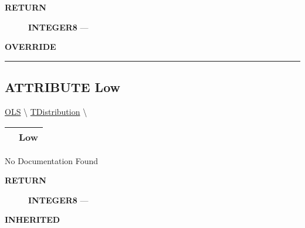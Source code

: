 \par
\begin{description}
\item [\colorbox{tagtype}{\color{white} \textbf{\textsf{RETURN}}}] \textbf{INTEGER8} --- 
\end{description}






\par
\begin{description}
\item [\colorbox{tagtype}{\color{white} \textbf{\textsf{OVERRIDE}}}] 
\end{description}



\rule{\linewidth}{0.5pt}
\subsection*{\textsf{\colorbox{headtoc}{\color{white} ATTRIBUTE}
Low}}

\hypertarget{ecldoc:linearregression.ols.tdistribution.low}{}
\hspace{0pt} \hyperlink{ecldoc:linearregression.ols}{OLS} \textbackslash 
\hspace{0pt} \hyperlink{ecldoc:linearregression.ols.tdistribution}{TDistribution} \textbackslash 

{\renewcommand{\arraystretch}{1.5}
\begin{tabularx}{\textwidth}{|>{\raggedright\arraybackslash}l|X|}
\hline
\hspace{0pt}\mytexttt{\color{red} } & \textbf{Low} \\
\hline
\end{tabularx}
}

\par





No Documentation Found








\par
\begin{description}
\item [\colorbox{tagtype}{\color{white} \textbf{\textsf{RETURN}}}] \textbf{INTEGER8} --- 
\end{description}






\par
\begin{description}
\item [\colorbox{tagtype}{\color{white} \textbf{\textsf{INHERITED}}}] 
\end{description}



